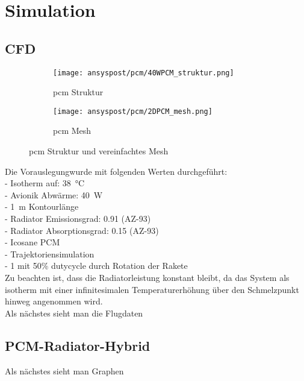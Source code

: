\chapter{Simulation}\label{chap:Simulation}

\section{CFD}\label{cfd}

\begin{figure}[H]
    \centering
    \begin{subfigure}[t]{0.7\textwidth}
        \centering
        \texttt{[image: ansyspost/pcm/40WPCM\_struktur.png]}
        \caption{\ac{pcm} Struktur}\label{fig:pcm_struktur}
    \end{subfigure}
    \hfill
    \begin{subfigure}[t]{0.15\textwidth}
        \centering
        \texttt{[image: ansyspost/pcm/2DPCM\_mesh.png]}
        \caption{\ac{pcm} Mesh}\label{fig:pcm_mesh}
    \end{subfigure}
    \caption{\ac{pcm} Struktur und vereinfachtes Mesh}\label{fig:pcm_geometrien}
\end{figure}

Die Vorauslegungwurde mit folgenden Werten durchgeführt:\\
- Isotherm auf: \SI{38}{\celsius}\\
- Avionik Abwärme: \SI{40}{W}\\
- \SI{1}{m} Kontourlänge\\
- Radiator Emissionsgrad: \SI{0,91}{} (AZ-93)\\
- Radiator Absorptionsgrad: \SI{0,15}{} (AZ-93)\\
- Icosane PCM\\
- Trajektoriensimulation\\
- \SI{1}{} mit 50\% dutycycle durch Rotation der Rakete\\
Zu beachten ist, dass die Radiatorleistung konstant bleibt, da das System als isotherm mit einer
infinitesimalen Temperaturerhöhung über den Schmelzpunkt hinweg angenommen wird.\\
Als nächstes sieht man die Flugdaten

\section{PCM-Radiator-Hybrid}\label{sec:pcm_radiator_hybrid_sim}

Als nächstes sieht man Graphen

